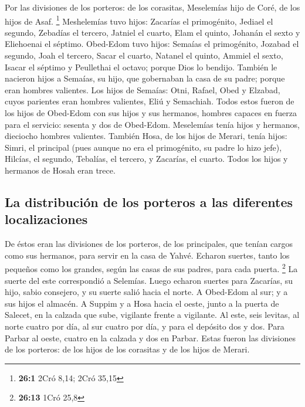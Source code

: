 \begin{paracol}{2}
 Por las divisiones de los porteros: de los corasitas,
Meselemías hijo de Coré, de los hijos de Asaf. \footnote{\textbf{26:1}
  2Cró 8,14; 2Cró 35,15}  Meshelemías tuvo hijos: Zacarías
el primogénito, Jediael el segundo, Zebadías el tercero, Jatniel el
cuarto,  Elam el quinto, Johanán el sexto y Eliehoenai el
séptimo.  Obed-Edom tuvo hijos: Semaías el primogénito,
Jozabad el segundo, Joah el tercero, Sacar el cuarto, Natanel el quinto,
 Ammiel el sexto, Isacar el séptimo y Peullethai el
octavo; porque Dios lo bendijo.  También le nacieron hijos
a Semaías, su hijo, que gobernaban la casa de su padre; porque eran
hombres valientes.  Los hijos de Semaías: Otni, Rafael,
Obed y Elzabad, cuyos parientes eran hombres valientes, Eliú y
Semachiah.  Todos estos fueron de los hijos de Obed-Edom
con sus hijos y sus hermanos, hombres capaces en fuerza para el
servicio: sesenta y dos de Obed-Edom.  Meselemías tenía
hijos y hermanos, dieciocho hombres valientes.  También
Hosa, de los hijos de Merari, tenía hijos: Simri, el principal (pues
aunque no era el primogénito, su padre lo hizo jefe), 
Hilcías, el segundo, Tebalías, el tercero, y Zacarías, el cuarto. Todos
los hijos y hermanos de Hosah eran trece.

\hypertarget{la-distribuciuxf3n-de-los-porteros-a-las-diferentes-localizaciones}{%
\subsection{La distribución de los porteros a las diferentes
localizaciones}\label{la-distribuciuxf3n-de-los-porteros-a-las-diferentes-localizaciones}}

 De éstos eran las divisiones de los porteros, de los
principales, que tenían cargos como sus hermanos, para servir en la casa
de Yahvé.  Echaron suertes, tanto los pequeños como los
grandes, según las casas de sus padres, para cada puerta. \footnote{\textbf{26:13}
  1Cró 25,8}  La suerte del este correspondió a Selemías.
Luego echaron suertes para Zacarías, su hijo, sabio consejero, y su
suerte salió hacia el norte.  A Obed-Edom al sur; y a sus
hijos el almacén.  A Suppim y a Hosa hacia el oeste,
junto a la puerta de Salecet, en la calzada que sube, vigilante frente a
vigilante.  Al este, seis levitas, al norte cuatro por
día, al sur cuatro por día, y para el depósito dos y dos.
 Para Parbar al oeste, cuatro en la calzada y dos en
Parbar.  Estas fueron las divisiones de los porteros: de
los hijos de los corasitas y de los hijos de Merari.


\end{paracol}
